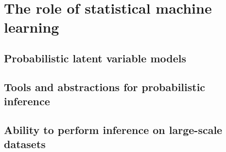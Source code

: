 \section{The role of statistical machine learning}

\subsection{Probabilistic latent variable models}

\subsection{Tools and abstractions for probabilistic inference}

\subsection{Ability to perform inference on large-scale datasets}


